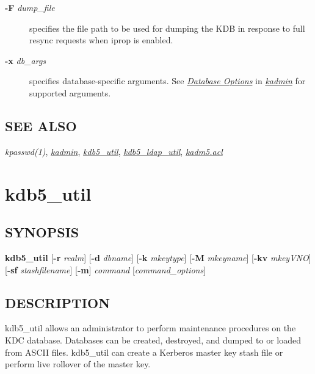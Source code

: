 \documentclass[letterpaper,10pt,english]{sphinxmanual}
\begin{document}
\begin{description}
\item[{\textbf{-F} \emph{dump\_file}}] \leavevmode
specifies the file path to be used for dumping the KDB in response
to full resync requests when iprop is enabled.

\item[{\textbf{-x} \emph{db\_args}}] \leavevmode
specifies database-specific arguments.  See {\hyperref[admin/admin_commands/kadmin_local:dboptions]{\emph{Database Options}}} in {\hyperref[admin/admin_commands/kadmin_local:kadmin-1]{\emph{kadmin}}} for supported arguments.

\end{description}


\subsection{SEE ALSO}
\label{admin/admin_commands/kadmind:see-also}
\emph{kpasswd(1)}, {\hyperref[admin/admin_commands/kadmin_local:kadmin-1]{\emph{kadmin}}}, {\hyperref[admin/admin_commands/kdb5_util:kdb5-util-8]{\emph{kdb5\_util}}},
{\hyperref[admin/admin_commands/kdb5_ldap_util:kdb5-ldap-util-8]{\emph{kdb5\_ldap\_util}}}, {\hyperref[admin/conf_files/kadm5_acl:kadm5-acl-5]{\emph{kadm5.acl}}}


\section{kdb5\_util}
\label{admin/admin_commands/kdb5_util:kdb5-util-8}\label{admin/admin_commands/kdb5_util::doc}\label{admin/admin_commands/kdb5_util:kdb5-util}

\subsection{SYNOPSIS}
\label{admin/admin_commands/kdb5_util:synopsis}\label{admin/admin_commands/kdb5_util:kdb5-util-synopsis}
\textbf{kdb5\_util}
{[}\textbf{-r} \emph{realm}{]}
{[}\textbf{-d} \emph{dbname}{]}
{[}\textbf{-k} \emph{mkeytype}{]}
{[}\textbf{-M} \emph{mkeyname}{]}
{[}\textbf{-kv} \emph{mkeyVNO}{]}
{[}\textbf{-sf} \emph{stashfilename}{]}
{[}\textbf{-m}{]}
\emph{command} {[}\emph{command\_options}{]}


\subsection{DESCRIPTION}
\label{admin/admin_commands/kdb5_util:kdb5-util-synopsis-end}\label{admin/admin_commands/kdb5_util:description}
kdb5\_util allows an administrator to perform maintenance procedures on
the KDC database.  Databases can be created, destroyed, and dumped to
or loaded from ASCII files.  kdb5\_util can create a Kerberos master
key stash file or perform live rollover of the master key.
\end{document}
